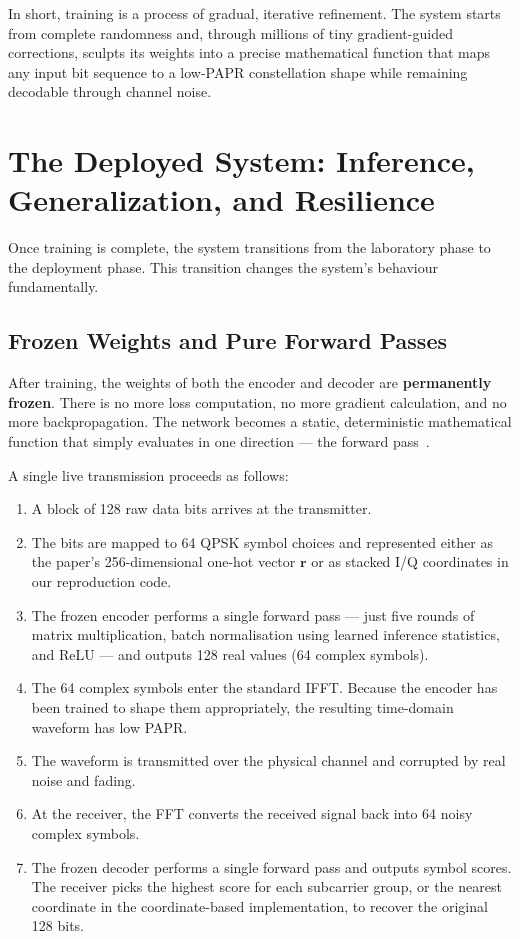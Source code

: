 In short, training is a process of gradual, iterative refinement.
The system starts from complete randomness and, through millions of
tiny gradient-guided corrections, sculpts its weights into a precise
mathematical function that maps any input bit sequence to a low-PAPR
constellation shape while remaining decodable through channel noise.


\section{The Deployed System: Inference, Generalization, and Resilience}
\label{sec:prnet_deployment}

Once training is complete, the system transitions from the laboratory phase
to the deployment phase.  This transition changes the system's behaviour
fundamentally.


\subsection{Frozen Weights and Pure Forward Passes}

After training, the weights of both the encoder and decoder are
\textbf{permanently frozen}.  There is no more loss computation, no more
gradient calculation, and no more backpropagation.  The network becomes
a static, deterministic mathematical function that simply evaluates in
one direction --- the forward pass~\cite{kim2017novel}.

A single live transmission proceeds as follows:
\begin{enumerate}
    \item A block of 128 raw data bits arrives at the transmitter.
    \item The bits are mapped to 64 QPSK symbol choices and represented
          either as the paper's 256-dimensional one-hot vector $\bm{r}$ or
          as stacked I/Q coordinates in our reproduction code.
    \item The frozen encoder performs a single forward pass --- just
          five rounds of matrix multiplication, batch normalisation using
          learned inference statistics, and ReLU --- and outputs 128 real
          values (64 complex symbols).
    \item The 64 complex symbols enter the standard IFFT.  Because the
          encoder has been trained to shape them appropriately, the
          resulting time-domain waveform has low PAPR.
    \item The waveform is transmitted over the physical channel and
          corrupted by real noise and fading.
    \item At the receiver, the FFT converts the received signal back
          into 64 noisy complex symbols.
    \item The frozen decoder performs a single forward pass and outputs
          symbol scores.  The receiver picks the highest score for each
          subcarrier group, or the nearest coordinate in the coordinate-based
          implementation, to recover the original 128 bits.
\end{enumerate}

